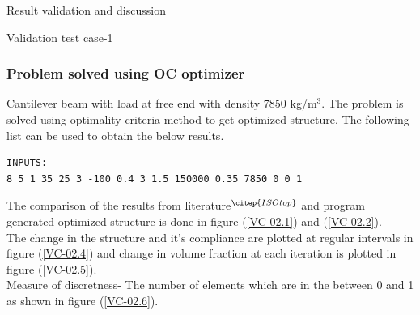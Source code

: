\documentclass[a4paper,12pt,times]{article}
\begin{document}
\begin{section}{Result validation and discussion}
\begin{subsection}{Validation test case-1}
\subsubsection{Problem solved using OC optimizer}
Cantilever beam with load at free end with density 7850 kg/m$^3$. The problem is solved using optimality criteria method to get optimized structure. The following list can be used to obtain the below results.\\
\begin{lstlisting}
INPUTS:
8 5 1 35 25 3 -100 0.4 3 1.5 150000 0.35 7850 0 0 1
\end{lstlisting}
The comparison of the results from literature$^{\citep{ISOtop}}$ and program generated optimized structure is done in figure (\ref{VC-02.1}) and (\ref{VC-02.2}).\\
The change in the structure and it's compliance are plotted at regular intervals in figure (\ref{VC-02.4}) and change in volume fraction at each iteration is plotted in figure (\ref{VC-02.5}).\\
Measure of discretness- The number of elements which are in the between 0 and 1 as shown in figure (\ref{VC-02.6}).\\
 

\end{subsection}
\end{section}
\end{document}
